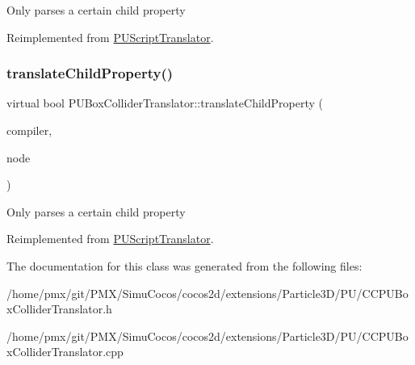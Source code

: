 Only parses a certain child property 

Reimplemented from \hyperlink{classPUScriptTranslator_a0374d83a8a04e57918975d525e0f8fe8}{P\+U\+Script\+Translator}.

\mbox{\label{classPUBoxColliderTranslator_ace524cc06a94cc0ac8dca7845121d0b9}} 
\subsubsection{\texorpdfstring{translate\+Child\+Property()}{translateChildProperty()}\hspace{0.1cm}{\footnotesize\ttfamily [2/2]}}
{\footnotesize\ttfamily virtual bool P\+U\+Box\+Collider\+Translator\+::translate\+Child\+Property (\begin{DoxyParamCaption}\item[{\hyperlink{classPUScriptCompiler}{P\+U\+Script\+Compiler} $\ast$}]{compiler,  }\item[{\hyperlink{classPUAbstractNode}{P\+U\+Abstract\+Node} $\ast$}]{node }\end{DoxyParamCaption})\hspace{0.3cm}{\ttfamily [virtual]}}

Only parses a certain child property 

Reimplemented from \hyperlink{classPUScriptTranslator_a0374d83a8a04e57918975d525e0f8fe8}{P\+U\+Script\+Translator}.



The documentation for this class was generated from the following files\+:\begin{DoxyCompactItemize}
\item 
/home/pmx/git/\+P\+M\+X/\+Simu\+Cocos/cocos2d/extensions/\+Particle3\+D/\+P\+U/C\+C\+P\+U\+Box\+Collider\+Translator.\+h\item 
/home/pmx/git/\+P\+M\+X/\+Simu\+Cocos/cocos2d/extensions/\+Particle3\+D/\+P\+U/C\+C\+P\+U\+Box\+Collider\+Translator.\+cpp\end{DoxyCompactItemize}
